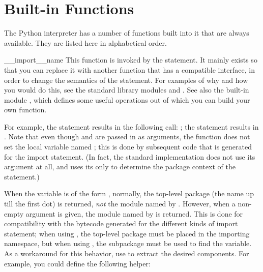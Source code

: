 \section{Built-in Functions \label{built-in-funcs}}

The Python interpreter has a number of functions built into it that
are always available.  They are listed here in alphabetical order.



\begin{funcdesc}{__import__}{name}
  This function is invoked by the 
  statement.  It mainly exists so that you can replace it with another
  function that has a compatible interface, in order to change the
  semantics of the  statement.  For examples of why
  and how you would do this, see the standard library modules
   and
  .  See also the built-in
  module , which defines some useful
  operations out of which you can build your own
   function.

  For example, the statement  results in the
  following call:  
  ; the statement 
  results in .  Note that even though  and
  \code{['eggs']} are passed in as arguments, the
   function does not set the local variable
  named ; this is done by subsequent code that is generated
  for the import statement.  (In fact, the standard implementation
  does not use its  argument at all, and uses its
   only to determine the package context of the
   statement.)

  When the  variable is of the form ,
  normally, the top-level package (the name up till the first dot) is
  returned, \emph{not} the module named by .  However, when
  a non-empty  argument is given, the module named by
   is returned.  This is done for compatibility with the
  bytecode generated for the different kinds of import statement; when
  using , the top-level package 
  must be placed in the importing namespace, but when using , the  subpackage must be used
  to find the  variable.  As a workaround for this
  behavior, use  to extract the desired
  components.  For example, you could define the following helper:


\end{funcdesc}
